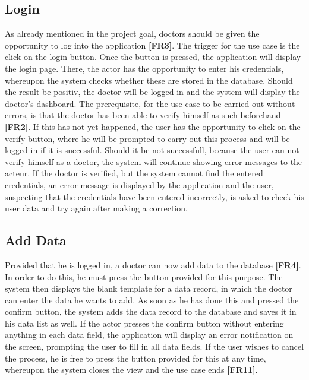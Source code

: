 \subsection{Login}
As already mentioned in the project goal, doctors should be given the opportunity to log into the application \textbf{[FR3]}. The trigger for the use case is the click on the login button. Once the button is pressed, the application will display the login page. There, the actor has the opportunity to enter his credentials, whereupon the system checks whether these are stored in the database. Should the result be positiv, the doctor will be logged in and the system will display the doctor's dashboard. The prerequisite, for the use case to be carried out without errors, is that the doctor has been able to verify himself as such beforehand \textbf{[FR2]}. If this has not yet happened, the user has the opportunity to click on the verify button, where he will be prompted to carry out this process and will be logged in if it is successful. Should it be not successfull, because the user can not verify himself as a doctor, the system will continue showing error messages to the acteur.  If the doctor is verified, but the system cannot find the entered credentials, an error message is displayed by the application and the user, suspecting that the credentials have been entered incorrectly, is asked to check his user data and try again after making a correction.

\subsection{Add Data}
Provided that he is logged in, a doctor can now add data to the database \textbf{[FR4]}. In order to do this, he must press the button provided for this purpose. The system then displays the blank template for a data record, in which the doctor can enter the data he wants to add. As soon as he has done this and pressed the confirm button, the system adds the data record to the database and saves it in his data list as well. If the actor presses the confirm button without entering anything in each data field, the application will display an error notification on the screen, prompting the user to fill in all data fields. If the user wishes to cancel the process, he is free to press the button provided for this at any time, whereupon the system closes the view and the use case ends \textbf{[FR11]}. 

